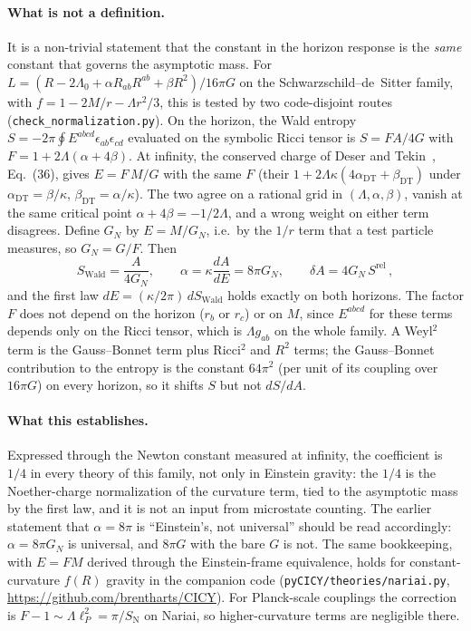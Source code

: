 \documentclass[11pt]{article}
\newcommand{\Srel}{S^{\mathrm{rel}}}
\begin{document}
\paragraph{What is not a definition.} It is a non-trivial statement that the constant in the horizon response is the \emph{same} constant that governs the asymptotic mass. For $L=(R-2\Lambda_0+\alpha R_{ab}R^{ab}+\beta R^2)/16\pi G$ on the Schwarzschild--de~Sitter family, with $f=1-2M/r-\Lambda r^2/3$, this is tested by two code-disjoint routes (\texttt{check\_normalization.py}). On the horizon, the Wald entropy $S=-2\pi\oint E^{abcd}\epsilon_{ab}\epsilon_{cd}$ evaluated on the symbolic Ricci tensor is $S=F A/4G$ with $F=1+2\Lambda(\alpha+4\beta)$. At infinity, the conserved charge of Deser and Tekin~\cite{DeserTekin2003}, Eq.~(36), gives $E=F\,M/G$ with the same $F$ (their $1+2\Lambda\kappa(4\alpha_{\mathrm{DT}}+\beta_{\mathrm{DT}})$ under $\alpha_{\mathrm{DT}}=\beta/\kappa$, $\beta_{\mathrm{DT}}=\alpha/\kappa$). The two agree on a rational grid in $(\Lambda,\alpha,\beta)$, vanish at the same critical point $\alpha+4\beta=-1/2\Lambda$, and a wrong weight on either term disagrees. Define $G_N$ by $E=M/G_N$, i.e.\ by the $1/r$ term that a test particle measures, so $G_N=G/F$. Then
\begin{equation}
S_{\mathrm{Wald}}=\frac{A}{4G_N},\qquad \alpha=\kappa\frac{dA}{dE}=8\pi G_N,\qquad \delta A=4G_N\,\Srel\,,
\label{eq:GN}
\end{equation}
and the first law $dE=(\kappa/2\pi)\,dS_{\mathrm{Wald}}$ holds exactly on both horizons. The factor $F$ does not depend on the horizon ($r_b$ or $r_c$) or on $M$, since $E^{abcd}$ for these terms depends only on the Ricci tensor, which is $\Lambda g_{ab}$ on the whole family. A Weyl$^2$ term is the Gauss--Bonnet term plus Ricci$^2$ and $R^2$ terms; the Gauss--Bonnet contribution to the entropy is the constant $64\pi^2$ (per unit of its coupling over $16\pi G$) on every horizon, so it shifts $S$ but not $dS/dA$.

\paragraph{What this establishes.} Expressed through the Newton constant measured at infinity, the coefficient is $1/4$ in every theory of this family, not only in Einstein gravity: the $1/4$ is the Noether-charge normalization of the curvature term, tied to the asymptotic mass by the first law, and it is not an input from microstate counting. The earlier statement that $\alpha=8\pi$ is ``Einstein's, not universal'' should be read accordingly: $\alpha=8\pi G_N$ is universal, and $8\pi G$ with the bare $G$ is not. The same bookkeeping, with $E=F M$ derived through the Einstein-frame equivalence, holds for constant-curvature $f(R)$ gravity in the companion code (\texttt{pyCICY/theories/nariai.py}, \url{https://github.com/brentharts/CICY}). For Planck-scale couplings the correction is $F-1\sim\Lambda\ell_P^2=\pi/S_{\mathrm N}$ on Nariai, so higher-curvature terms are negligible there.
\end{document}
